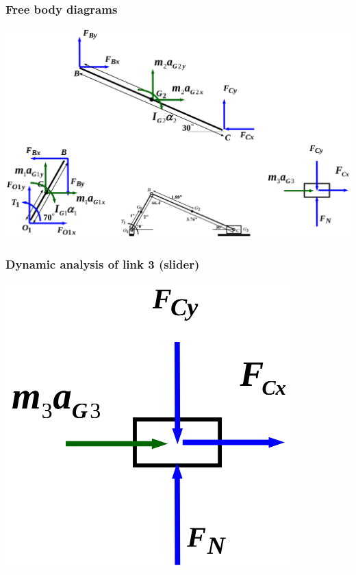 \documentclass[11pt]{article}
\begin{document}
\subsubsection{Free body diagrams}
\label{sec:org31079f4}
\begin{center}
\includegraphics[width=.9\linewidth]{./images/dynamic-force-analysis-example-2-free-body-diagrams.png}
\end{center}
\subsubsection{Dynamic analysis of link 3 (slider)}
\label{sec:org0e4e49e}
\begin{center}
\includegraphics[width=.9\linewidth]{./images/dynamic-force-analysis-example-2-link-3-free-body-diagram.png}
\end{center}
\end{document}
